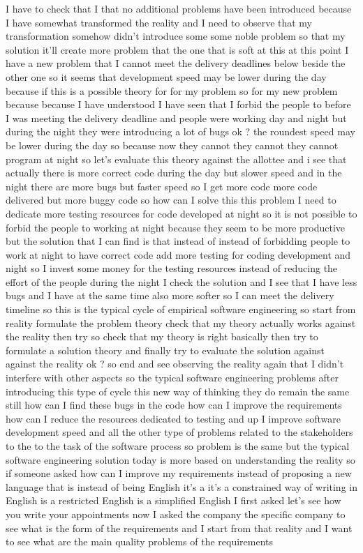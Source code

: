 \documentclass[conference, compsoc, twoside]{IEEEtran}
\begin{document}
 I have to check that I that no additional problems have been introduced because I have somewhat transformed the reality and I need to observe that my transformation somehow didn't introduce some some noble problem so that my solution it'll create more problem that the one that is soft at this at this point I have a new problem that I cannot meet the delivery deadlines below beside the other one so it seems that development speed may be lower during the day because if this is a possible theory for for my problem so for my new problem because because I have understood I have seen that I forbid the people to before I was meeting the delivery deadline and people were working day and night but during the night they were introducing a lot of bugs ok ? the roundest speed may be lower during the day so because now they cannot they cannot they cannot program at night so let's evaluate this theory against the allottee and i see that actually there is more correct code during the day but slower speed and in the night there are more bugs but faster speed 
so I get more code more code delivered but more buggy code so how can I solve this this problem I need to dedicate more testing resources for code developed at night so it is not possible to forbid the people to working at night because they seem to be more productive but the solution that I can find is that instead of instead of forbidding people to work at night to have correct code add more testing for coding development and night 
so I invest some money for the testing resources instead of reducing the effort of the people during the night I check the solution and I see that I have less bugs and I have at the same time also more softer 
so I can meet the delivery timeline so this is the typical cycle of empirical software engineering so start from reality formulate the problem theory check that my theory actually works against the reality then try so check that my theory is right basically then try to formulate a solution theory and finally try to evaluate the solution against against the reality ok ? so end and see observing the reality again that I didn't interfere with other aspects so the typical software engineering problems after introducing this type of cycle this new way of thinking they do remain the same still how can I find these bugs in the code how can I improve the requirements how can I reduce the resources dedicated to testing and up I improve software development speed and all the other type of problems related to the stakeholders to the to the task of the software process so problem is the same but the typical software engineering solution today is more based on understanding the reality so if someone asked how can I improve my requirements instead of proposing a new language that is instead of being English it's a it's a constrained way of writing in English is a restricted English is a simplified English I first asked let's see how you write your appointments now I asked the company the specific company to see what is the form of the requirements and I start from that reality and I want to see what are the main quality problems of the requirements 
\end{document}
